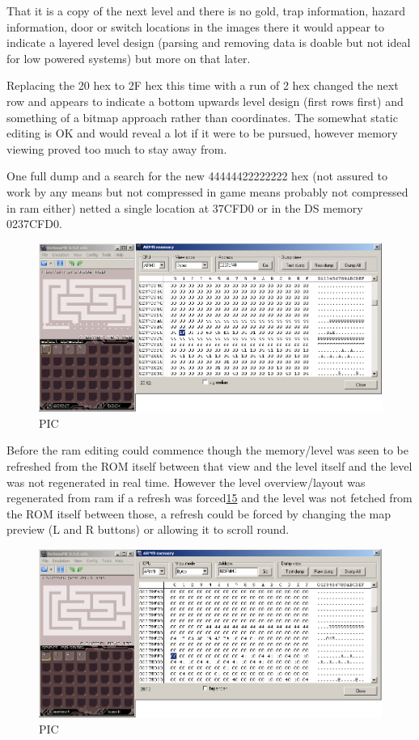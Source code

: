 \documentclass[
]{book}
\begin{document}
That it is a copy of the next level and there is no gold, trap information, hazard information, door or switch locations in the images there it would appear to indicate a layered level design (parsing and removing data is doable but not ideal for low powered systems) but more on that later.

Replacing the 20 hex to 2F hex this time with a run of 2 hex changed the next row and appears to indicate a bottom upwards level design (first rows first) and something of a bitmap approach rather than coordinates. The somewhat static editing is OK and would reveal a lot if it were to be pursued, however memory viewing proved too much to stay away from.

One full dump and a search for the new 44444422222222 hex (not assured to work by any means but not compressed in game means probably not compressed in ram either) netted a single location at 37CFD0 or in the DS memory 0237CFD0.

\begin{figure}
\centering
\includegraphics{images/173_home_fast6191_romhackingguide_unrenamed_fil___ers_romhackingguideleveleditingworkedNplus5.png}
\caption{PIC}
\end{figure}

Before the ram editing could commence though the memory/level was seen to be refreshed from the ROM itself between that view and the level itself and the level was not regenerated in real time. However the level overview/layout was regenerated from ram if a refresh was forced\href{romhacking202016.html\#fn15x0}{15} and the level was not fetched from the ROM itself between those, a refresh could be forced by changing the map preview (L and R buttons) or allowing it to scroll round.

\begin{figure}
\centering
\includegraphics{images/174_home_fast6191_romhackingguide_unrenamed_fil___ers_romhackingguideleveleditingworkedNplus7.png}
\caption{PIC}
\end{figure}
\end{document}
